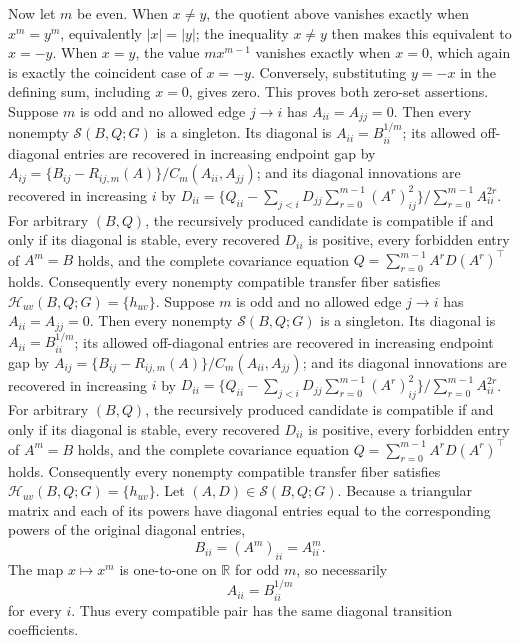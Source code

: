 Now let \(m\) be even.  When \(x\ne y\), the quotient above vanishes exactly when \(x^m=y^m\), equivalently \(|x|=|y|\); the inequality \(x\ne y\) then makes this equivalent to \(x=-y\).  When \(x=y\), the value \(m x^{m-1}\) vanishes exactly when \(x=0\), which again is exactly the coincident case of \(x=-y\).  Conversely, substituting \(y=-x\) in the defining sum, including \(x=0\), gives zero.  This proves both zero-set assertions.
Suppose \(m\) is odd and no allowed edge \(j\to i\) has \(A_{ii}=A_{jj}=0\). Then every nonempty \(\mathcal S(B,Q;G)\) is a singleton. Its diagonal is \(A_{ii}=B_{ii}^{1/m}\); its allowed off-diagonal entries are recovered in increasing endpoint gap by \(A_{ij}=\{B_{ij}-R_{ij,m}(A)\}/C_m(A_{ii},A_{jj})\); and its diagonal innovations are recovered in increasing \(i\) by \(D_{ii}=\{Q_{ii}-\sum_{j<i}D_{jj}\sum_{r=0}^{m-1}(A^r)_{ij}^2\}/\sum_{r=0}^{m-1}A_{ii}^{2r}\). For arbitrary \((B,Q)\), the recursively produced candidate is compatible if and only if its diagonal is stable, every recovered \(D_{ii}\) is positive, every forbidden entry of \(A^m=B\) holds, and the complete covariance equation \(Q=\sum_{r=0}^{m-1}A^rD(A^r)^\top\) holds. Consequently every nonempty compatible transfer fiber satisfies \(\mathcal H_{uv}(B,Q;G)=\{h_{uv}\}\).
Suppose \(m\) is odd and no allowed edge \(j\to i\) has \(A_{ii}=A_{jj}=0\). Then every nonempty \(\mathcal S(B,Q;G)\) is a singleton. Its diagonal is \(A_{ii}=B_{ii}^{1/m}\); its allowed off-diagonal entries are recovered in increasing endpoint gap by \(A_{ij}=\{B_{ij}-R_{ij,m}(A)\}/C_m(A_{ii},A_{jj})\); and its diagonal innovations are recovered in increasing \(i\) by \(D_{ii}=\{Q_{ii}-\sum_{j<i}D_{jj}\sum_{r=0}^{m-1}(A^r)_{ij}^2\}/\sum_{r=0}^{m-1}A_{ii}^{2r}\). For arbitrary \((B,Q)\), the recursively produced candidate is compatible if and only if its diagonal is stable, every recovered \(D_{ii}\) is positive, every forbidden entry of \(A^m=B\) holds, and the complete covariance equation \(Q=\sum_{r=0}^{m-1}A^rD(A^r)^\top\) holds. Consequently every nonempty compatible transfer fiber satisfies \(\mathcal H_{uv}(B,Q;G)=\{h_{uv}\}\).
Let \((A,D)\in\mathcal S(B,Q;G)\).  Because a triangular matrix and each of its powers have diagonal entries equal to the corresponding powers of the original diagonal entries,
\[
 B_{ii}=(A^m)_{ii}=A_{ii}^m.
\]
The map \(x\mapsto x^m\) is one-to-one on \(\mathbb R\) for odd \(m\), so necessarily
\[
 A_{ii}=B_{ii}^{1/m}
\]
for every \(i\).  Thus every compatible pair has the same diagonal transition coefficients.

